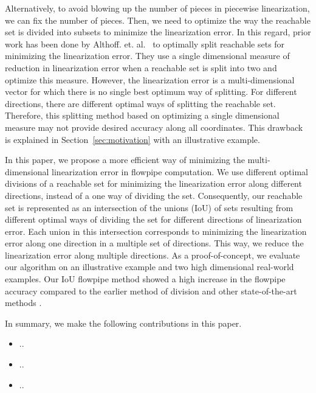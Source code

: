 Alternatively, to avoid blowing up the number of pieces in piecewise
linearization, we can fix the number of pieces.  Then, we need to
optimize the way the reachable set is divided into subsets to minimize
the linearization error.  In this regard, prior work has been done by
Althoff. et. al.~\cite{althoff2008reachability} to optimally split
reachable sets for minimizing the linearization error.  They use a single
dimensional measure of reduction in linearization error when a
reachable set is split into two and optimize this measure.  However,
the linearization error is a multi-dimensional vector for which there
is no single best optimum way of splitting.  For different directions,
there are different optimal ways of splitting the reachable set.
Therefore, this splitting method based on optimizing a single
dimensional measure may not provide desired accuracy along all coordinates.
This drawback is explained in Section~\ref{sec:motivation} with an illustrative example.

In this paper, we propose a more efficient way of minimizing the
multi-dimensional linearization error in flowpipe computation.  We use
different optimal divisions of a reachable set for minimizing the
linearization error along different directions, instead of a one way
of dividing the set.  Consequently, our reachable set is represented as
an intersection of the unions (IoU) of sets resulting from different
optimal ways of dividing the set for different directions of
linearization error.  Each union in this intersection corresponds to
minimizing the linearization error along one direction in a multiple
set of directions.  This way, we reduce the linearization error along
multiple directions.  As a proof-of-concept, we evaluate our algorithm
on an illustrative example and two high dimensional real-world
examples. Our IoU flowpipe method showed a high increase in the flowpipe accuracy
compared to the earlier method of division and other state-of-the-art
methods .

In summary, we make the following contributions in this paper.
\begin{itemize}
    \item ..
    \item ..
    \item ..
\end{itemize}

